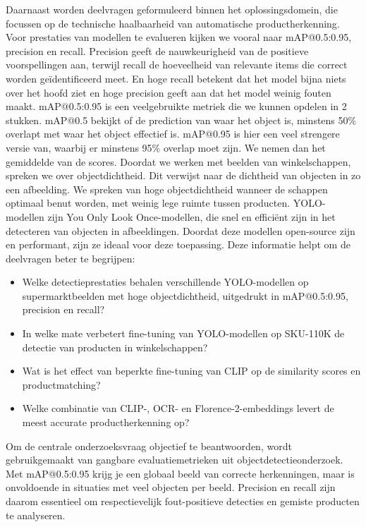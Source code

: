 \documentclass[dutch,dit,thesis]{hogentreport}
\begin{document}
Daarnaast worden deelvragen geformuleerd binnen het oplossingsdomein, die focussen op de technische haalbaarheid van automatische productherkenning.
Voor prestaties van modellen te evalueren kijken we vooral naar mAP@0.5:0.95, precision en recall. Precision geeft de nauwkeurigheid van de positieve voorspellingen aan, terwijl recall de hoeveelheid van relevante items die correct worden geïdentificeerd meet. En hoge recall betekent dat het model bijna niets over het hoofd ziet en hoge precision geeft aan dat het model weinig fouten maakt.
mAP@0.5:0.95 is een veelgebruikte metriek die we kunnen opdelen in 2 stukken. mAP@0.5 bekijkt of de prediction van waar het object is, minstens 50\% overlapt met waar het object effectief is. mAP@0.95 is hier een veel strengere versie van, waarbij er minstens 95\% overlap moet zijn. We nemen dan het gemiddelde van de scores. 
Doordat we werken met beelden van winkelschappen, spreken we over objectdichtheid. Dit verwijst naar de dichtheid van objecten in zo een afbeelding. We spreken van hoge objectdichtheid wanneer de schappen optimaal benut worden, met weinig lege ruimte tussen producten. 
YOLO-modellen zijn You Only Look Once-modellen, die snel en efficiënt zijn in het detecteren van objecten in afbeeldingen. Doordat deze modellen open-source zijn en performant, zijn ze ideaal voor deze toepassing. Deze informatie helpt om de deelvragen beter te begrijpen:
\begin{itemize}
    \item Welke detectieprestaties behalen verschillende YOLO-modellen op supermarktbeelden met hoge objectdichtheid, uitgedrukt in mAP@0.5:0.95, precision en recall?
    \item In welke mate verbetert fine-tuning van YOLO-modellen op SKU-110K de detectie van producten in winkelschappen?
    \item Wat is het effect van beperkte fine-tuning van CLIP op de similarity scores en productmatching?
    \item Welke combinatie van CLIP-, OCR- en Florence-2-embeddings levert de meest accurate productherkenning op?
\end{itemize}

Om de centrale onderzoeksvraag objectief te beantwoorden, wordt gebruikgemaakt van gangbare evaluatiemetrieken uit objectdetectieonderzoek. Met mAP@0.5:0.95 krijg je een globaal beeld van correcte herkenningen, maar is onvoldoende in situaties met veel objecten per beeld. Precision en recall zijn daarom essentieel om respectievelijk fout-positieve detecties en gemiste producten te analyseren. 
\end{document}
